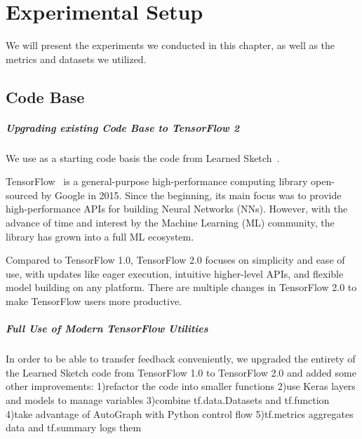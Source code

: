 \chapter{Experimental Setup}
\label{chapter:experimental_setup}

We will present the experiments we conducted in this chapter, as well as the metrics and datasets we utilized. 

\section{Code Base}

\paragraph{Upgrading existing Code Base to TensorFlow 2}

We use as a starting code basis the code from Learned Sketch~\cite{hsu2019learning}.

TensorFlow~\cite{tensorflow2015-whitepaper} is a general-purpose high-performance computing library open-sourced by Google in 2015. Since the beginning, its main focus was to provide high-performance APIs for building Neural Networks (NNs). However, with the advance of time and interest by the Machine Learning (ML) community, the library has grown into a full ML ecosystem.

Compared to TensorFlow 1.0, TensorFlow 2.0 focuses on simplicity and ease of use, with updates like eager execution, intuitive higher-level APIs, and flexible model building on any platform. There are multiple changes in TensorFlow 2.0 to make TensorFlow users more productive.

\paragraph{Full Use of Modern TensorFlow Utilities}
In order to be able to transfer feedback conveniently, we upgraded the entirety of the Learned Sketch code from TensorFlow 1.0 to TensorFlow 2.0 and added some other improvements: 1)refactor the code into smaller functions 2)use Keras layers and models to manage variables 3)combine tf.data.Datasets and tf.function 4)take advantage of AutoGraph with Python control flow 5)tf.metrics aggregates data and tf.summary logs them 

